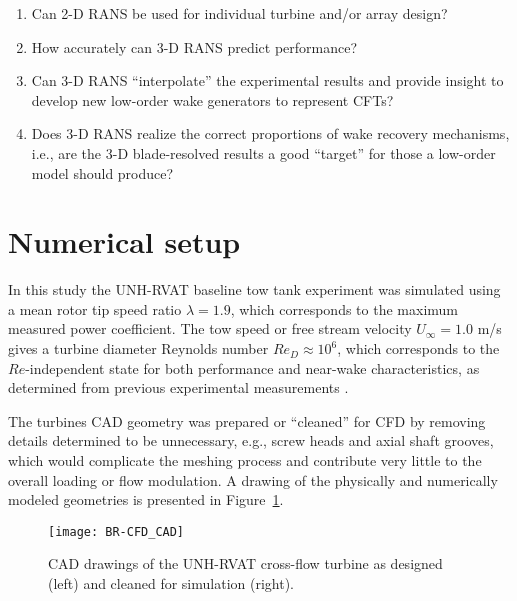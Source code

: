 \begin{enumerate}
    \item Can 2-D RANS be used for individual turbine and/or array design?

    \item How accurately can 3-D RANS predict performance?

    \item Can 3-D RANS ``interpolate'' the experimental results and provide
    insight to develop new low-order wake generators to represent CFTs?

    \item Does 3-D RANS realize the correct proportions of wake recovery
    mechanisms, i.e., are the 3-D blade-resolved results a good ``target'' for
    those a low-order model should produce?
\end{enumerate}


\section{Numerical setup}

In this study the UNH-RVAT baseline tow tank experiment was simulated using a
mean rotor tip speed ratio $\lambda=1.9$, which corresponds to the maximum
measured power coefficient. The tow speed or free stream velocity $U_\infty=1.0$
m/s gives a turbine diameter Reynolds number $Re_D \approx 10^6$, which
corresponds to the $Re$-independent state for both performance and near-wake
characteristics, as determined from previous experimental measurements
\cite{Bachant2014, Bachant2016-Energies}.

The turbines CAD geometry was prepared or ``cleaned'' for CFD by removing
details determined to be unnecessary, e.g., screw heads and axial shaft grooves,
which would complicate the meshing process and contribute very little to the
overall loading or flow modulation. A drawing of the physically and numerically
modeled geometries is presented in Figure~\ref{fig:cfd-cad}.

\begin{figure}
    \centering

    \texttt{[image: BR-CFD\_CAD]}

    \caption{CAD drawings of the UNH-RVAT cross-flow turbine as designed (left)
        and cleaned for simulation (right).}

    \label{fig:cfd-cad}
\end{figure}

